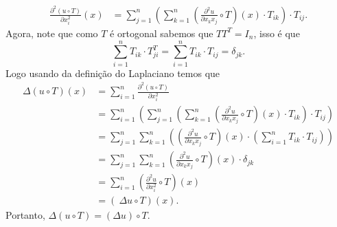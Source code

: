\begin{homeworkProblem}
\begin{solution}
    \begin{align*}
      \frac{\partial^{2} (u\circ T)}{\partial x_i^{2}}(x)&=\sum_{j=1}^{n}\left( \sum_{k=1}^{n}\left( \frac{\partial^{2}u }{\partial x_kx_j}\circ T\right) (x)\cdot T_{ik}\right)\cdot T_{ij}.
    \end{align*}
    Agora, note que como $T$ é ortogonal sabemos que $TT^{T}=I_n$, isso é que 
    $$\displaystyle \sum_{i=1}^{n}T_{ik}\cdot T^{T}_{ji}=\sum_{i=1}^{n}T_{ik}\cdot T_{ij}=\delta_{jk}.$$
    Logo usando da definição do Laplaciano temos que
    \begin{align*}
      \Delta(u\circ T)(x)&=\sum_{i=1}^{n}\frac{\partial^{2} (u\circ T)}{\partial x_i^{2}}\\
      &=\sum_{i=1}^{n}\left(\sum_{j=1}^{n}\left( \sum_{k=1}^{n}\left( \frac{\partial^{2}u }{\partial x_kx_j}\circ T\right) (x)\cdot T_{ik}\right)\cdot T_{ij}\right)\\
      &=\sum_{j=1}^{n}\sum_{k=1}^{n}\left(\left( \frac{\partial^{2} u}{\partial x_kx_j}\circ T \right)(x)\cdot \left(\sum_{i=1}^{n}T_{ik}\cdot T_{ij}\right)\right)\\
      &=\sum_{j=1}^{n}\sum_{k=1}^{n}\left( \frac{\partial^{2} u}{\partial x_kx_j}\circ T \right)(x)\cdot \delta_{jk}\\
      &=\sum_{i=1}^{n}\left( \frac{\partial^{2}u }{\partial x_{i}^{2}}\circ T \right)(x)\\
      &=\left(\ \Delta u \circ T\right)(x).
    \end{align*}
    Portanto, $\Delta(u\circ T)=\left( \Delta u \right)\circ T$.
  \end{solution}
\end{homeworkProblem}
